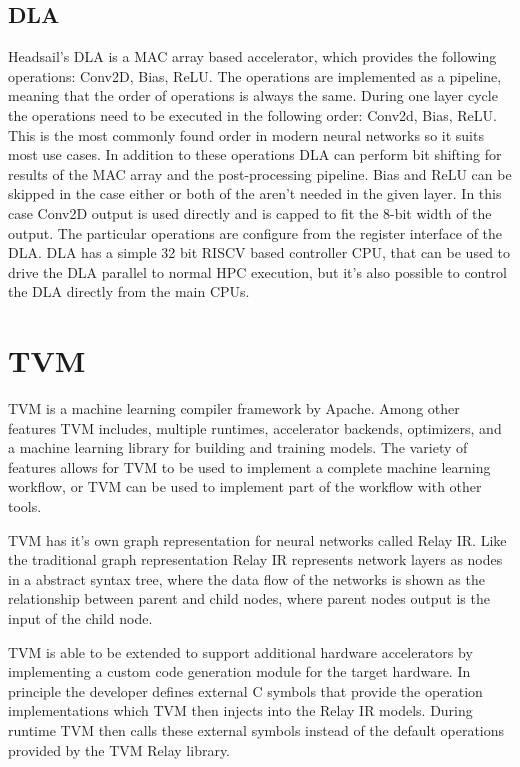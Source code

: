 \documentclass[12pt,a4paper,english
]{tunithesis}
\begin{document}
\subsection{DLA}
Headsail's DLA is a MAC array based accelerator, which provides the following operations: Conv2D, Bias, ReLU. The operations are implemented as a pipeline, meaning that the order of operations is always the same. During one layer cycle the operations need to be executed in the following order: Conv2d, Bias, ReLU. This is the most commonly found order in modern neural networks so it suits most use cases. In addition to these operations DLA can perform bit shifting for results of the MAC array and the post-processing pipeline.
Bias and ReLU can be skipped in the case either or both of the aren't needed in the given layer. In this case Conv2D output is used directly and is capped to fit the 8-bit width of the output.
The particular operations are configure from the register interface of the DLA.
DLA has a simple 32 bit RISCV based controller CPU, that can be used to drive the DLA parallel to normal HPC execution, but it's also possible to control the DLA directly from the main CPUs.

\section{TVM}
TVM is a machine learning compiler framework by Apache. Among other features TVM includes, multiple runtimes, accelerator backends, optimizers, and a machine learning library for building and training models. The variety of features allows for TVM to be used to implement a complete machine learning workflow, or TVM can be used to implement part of the workflow with other tools.

TVM has it's own graph representation for neural networks called Relay IR. Like the traditional graph representation Relay IR represents network layers as nodes in a abstract syntax tree, where the data flow of the networks is shown as the relationship between parent and child nodes, where parent nodes output is the input of the child node.

TVM is able to be extended to support additional hardware accelerators by implementing a custom code generation module for the target hardware. In principle the developer defines external C symbols that provide the operation implementations which TVM then injects into the Relay IR models. During runtime TVM then calls these external symbols instead of the default operations provided by the TVM Relay library.
\end{document}
